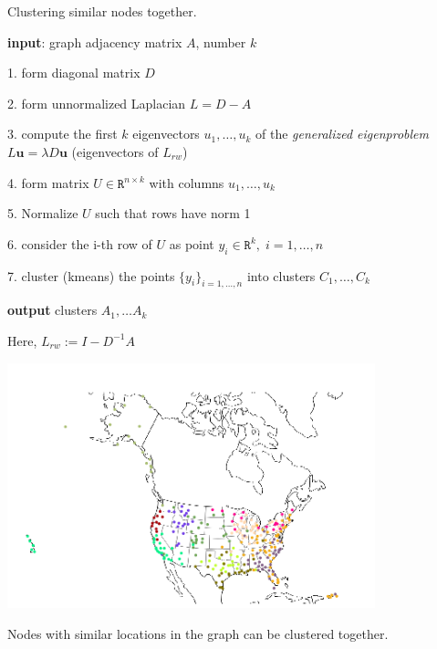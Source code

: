\documentclass[a4paper,12pt]{article}
\begin{document}
  Clustering similar nodes together.

  \textbf{input}: graph adjacency matrix $A$, number $k$
  
  1. form diagonal matrix $D$
  
  2. form unnormalized Laplacian $L = D − A$
  

  3. compute the first $k$ eigenvectors $u_1 , \dots, u_k$ of the \textit{generalized eigenproblem} $L \mathbf{u} = \lambda D \mathbf{u}$ (eigenvectors of $L_{rw}$)

  4. form matrix $U \in \texttt{R}^{n \times k}$ with columns $u_1, \dots, u_k$
  
  5. Normalize $U$ such that rows have norm 1
  
  6. consider the i-th row of $U$ as point $y_i \in \texttt{R}^k, \; i=1, \dots, n$
  
  7. cluster (kmeans) the points $\{y_i\}_{i=1, \dots, n}$ into clusters $C_1, \dots, C_k$
 
  \textbf{output} clusters $A_1, \dots A_k$

  Here, $L_{rw} := I - D^{-1} A$

  \begin{center}
  \includegraphics[width=0.8\textwidth]{cluster}
\end{center}

Nodes with similar locations in the graph can be clustered together.
\end{document}
